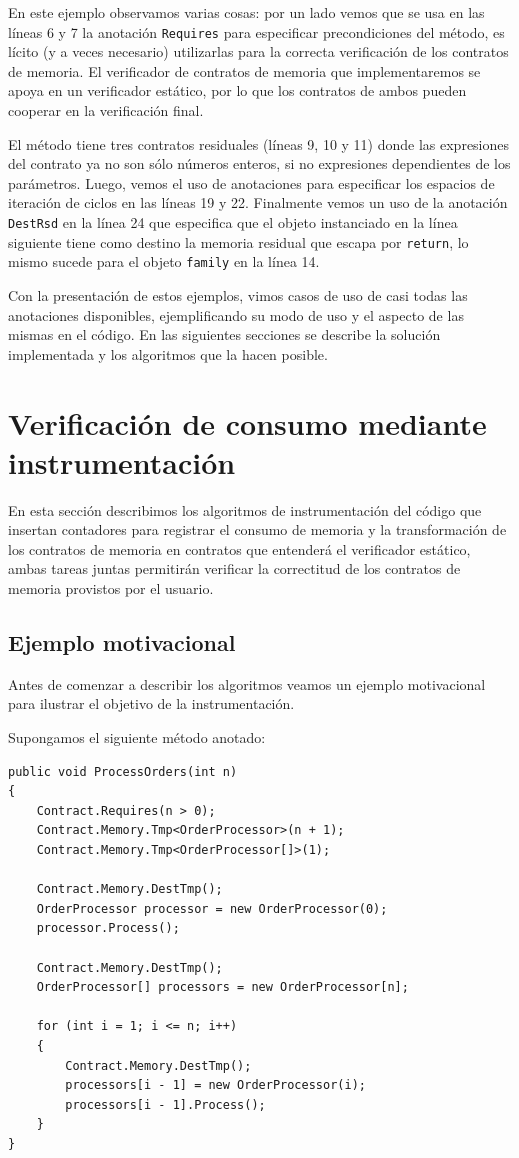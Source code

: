 \documentclass[12pt,a4paper]{article}
\newcommand\mono[1]{\texttt{#1}}
\begin{document}
		En este ejemplo observamos varias cosas: por un lado vemos que se usa en las líneas 6 y 7 la anotación \mono{Requires} para especificar precondiciones del método, es lícito (y a veces necesario) utilizarlas para la correcta verificación de los contratos de memoria. El verificador de contratos de memoria que implementaremos se apoya en un verificador estático, por lo que los contratos de ambos pueden cooperar en la verificación final.

		El método tiene tres contratos residuales (líneas 9, 10 y 11) donde las expresiones del contrato ya no son sólo números enteros, si no expresiones dependientes de los parámetros. Luego, vemos el uso de anotaciones para especificar los espacios de iteración de ciclos en las líneas 19 y 22. Finalmente vemos un uso de la anotación \mono{DestRsd} en la línea 24 que especifica que el objeto instanciado en la línea siguiente tiene como destino la memoria residual que escapa por \mono{return}, lo mismo sucede para el objeto \mono{family} en la línea 14.

		Con la presentación de estos ejemplos, vimos casos de uso de casi todas las anotaciones disponibles, ejemplificando su modo de uso y el aspecto de las mismas en el código. En las siguientes secciones se describe la solución implementada y los algoritmos que la hacen posible.

	\newpage
	\section{Verificación de consumo mediante instrumentación} \label{sec:verifcons}
		En esta sección describimos los algoritmos de instrumentación del código que insertan contadores para registrar el consumo de memoria y la transformación de los contratos de memoria en contratos que entenderá el verificador estático, ambas tareas juntas permitirán verificar la correctitud de los contratos de memoria provistos por el usuario.
		\subsection{Ejemplo motivacional}
			Antes de comenzar a describir los algoritmos veamos un ejemplo motivacional para ilustrar el objetivo de la instrumentación.

			Supongamos el siguiente método anotado:

			\vspace{15pt}
			\begin{lstlisting}[caption=Ejemplo motivacional para instrumentación, label=ejanotinstr]
public void ProcessOrders(int n)
{
	Contract.Requires(n > 0);
	Contract.Memory.Tmp<OrderProcessor>(n + 1);
	Contract.Memory.Tmp<OrderProcessor[]>(1);

	Contract.Memory.DestTmp();
	OrderProcessor processor = new OrderProcessor(0);
	processor.Process();

	Contract.Memory.DestTmp();
	OrderProcessor[] processors = new OrderProcessor[n];

	for (int i = 1; i <= n; i++)
	{
		Contract.Memory.DestTmp();
		processors[i - 1] = new OrderProcessor(i);
		processors[i - 1].Process();
	}
}
			\end{lstlisting}
\end{document}
